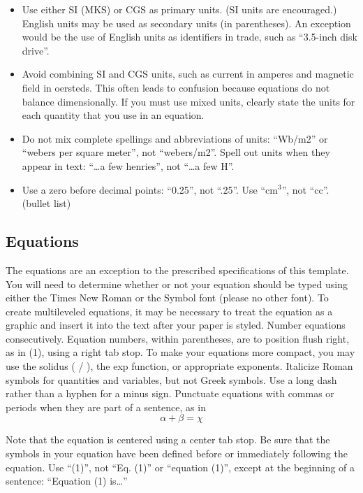 \documentclass[letterpaper, 10 pt, conference]{ieeeconf}  %
\begin{document}
\begin{itemize}

\item Use either SI (MKS) or CGS as primary units. (SI units are encouraged.) English units may be used as secondary units (in parentheses). An exception would be the use of English units as identifiers in trade, such as ``3.5-inch disk drive''.
\item Avoid combining SI and CGS units, such as current in amperes and magnetic field in oersteds. This often leads to confusion because equations do not balance dimensionally. If you must use mixed units, clearly state the units for each quantity that you use in an equation.
\item Do not mix complete spellings and abbreviations of units: ``Wb/m2'' or ``webers per square meter'', not ``webers/m2''.  Spell out units when they appear in text: ``\ldots a few henries'', not ``\ldots a few H''.
\item Use a zero before decimal points: ``0.25'', not ``.25''. Use ``cm$^3$'', not ``cc''. (bullet list)

\end{itemize}


\subsection{Equations}

The equations are an exception to the prescribed specifications of this template. You will need to determine whether or not your equation should be typed using either the Times New Roman or the Symbol font (please no other font). To create multileveled equations, it may be necessary to treat the equation as a graphic and insert it into the text after your paper is styled. Number equations consecutively. Equation numbers, within parentheses, are to position flush right, as in (1), using a right tab stop. To make your equations more compact, you may use the solidus ( / ), the exp function, or appropriate exponents. Italicize Roman symbols for quantities and variables, but not Greek symbols. Use a long dash rather than a hyphen for a minus sign. Punctuate equations with commas or periods when they are part of a sentence, as in
\begin{equation}
\alpha + \beta = \chi
\end{equation}

Note that the equation is centered using a center tab stop. Be sure that the symbols in your equation have been defined before or immediately following the equation. Use ``(1)'', not ``Eq. (1)'' or ``equation (1)'', except at the beginning of a sentence: ``Equation (1) is\ldots''
\end{document}
